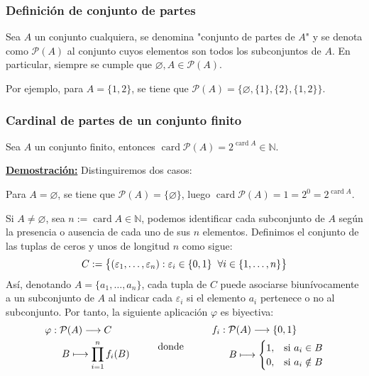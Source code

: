 \documentclass[12pt,a4paper]{article}
\newcommand{\card}{\operatorname{card}}
\newcommand{\N}{\mathbb{N}}
\newcounter{unit}[section]
\newcounter{chapter}[unit]
\renewcommand{\theunit}{\arabic{unit}}
\renewcommand{\thechapter}{\arabic{chapter}}
\renewcommand{\thesubsubsection}{\theunit.\thechapter.\arabic{subsubsection}}
\newcommand{\result}[1]{%
  \subsubsection{#1}%
  \label{result:\thesubsubsection}
}
\newcommand{\dem}{
    \noindent \underline{\textbf{Demostración:}}
}
\begin{document}
\vspace{6mm}
\result{Definición de conjunto de partes}
\hspace{3mm}
Sea $A$ un conjunto cualquiera, se denomina "conjunto de partes de $A$" y se denota como $\mathcal{P}(A)$
al conjunto cuyos elementos son todos los subconjuntos de $A$. En particular, siempre se cumple
que $\varnothing, A \in \mathcal{P}(A)$.

\vspace{2mm} \noindent
Por ejemplo, para $A = \{1,2\}$, se tiene que $\mathcal{P}(A) = \big\{\varnothing, \{1\}, \{2\}, \{1,2\} \big\}$.

\vspace{6mm}
\result{Cardinal de partes de un conjunto finito}
\hspace{3mm}
Sea $A$ un conjunto finito, entonces $\card \mathcal{P}(A) = 2^{\text{} \card A} \in \N$.

\vspace{4mm}
\dem Distinguiremos dos casos:

\vspace{2mm} \noindent
Para $A = \varnothing$, se tiene que $\mathcal{P}(A) = \{\varnothing\}$, luego $\card \mathcal{P}(A) = 1 = 2^0 = 2^{\text{} \card A}$.

\vspace{4mm}
Si $A \neq \varnothing$, sea $n := \card A \in \N$, podemos identificar cada subconjunto de $A$ según la presencia o ausencia de cada uno de sus $n$ elementos.
Definimos el conjunto de las tuplas de ceros y unos de longitud $n$ como sigue:
\vspace{-1ex}
$$C := \big\{(\varepsilon_1 , \ldots, \varepsilon_n) : \varepsilon_i \in \{0,1\} \hspace{2mm} \forall i \in \{1,\ldots,n\}\big\}$$
Así, denotando $A = \{a_1, \ldots, a_n\}$, cada tupla de $C$ puede asociarse biunívocamente a un subconjunto de $A$ al indicar cada
$\varepsilon_i$ si el elemento $a_i$ pertenece o no al subconjunto. Por tanto, la siguiente aplicación $\varphi$ es biyectiva:
\[
\begin{aligned}
    &\varphi : \mathcal{P}(A) \longrightarrow C \\
    &\hspace{6mm} B \longmapsto \prod_{i=1}^{n} f_i(B)
\end{aligned}
\hspace{10mm}
\text{donde}
\hspace{10mm}
\begin{aligned}
    &f_i : \mathcal{P}(A) \longrightarrow \{0,1\} \\
    &\hspace{6mm} B \longmapsto
    \begin{cases}
        1, & \text{si } a_i \in B \\
        0, & \text{si } a_i \notin B
    \end{cases}
\end{aligned}
\]
\end{document}
